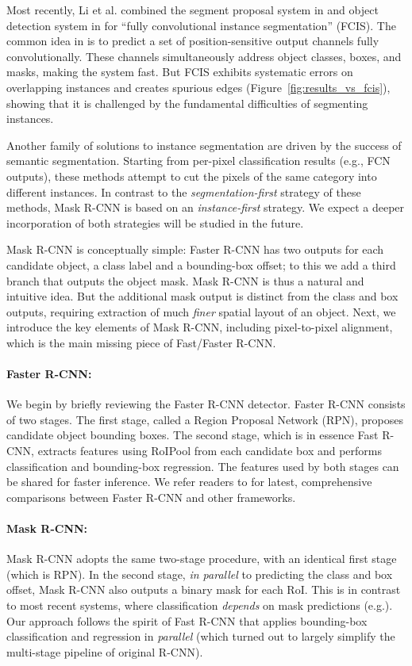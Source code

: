 Most recently, Li et al. combined the segment proposal system in and object detection system in for ``fully convolutional instance segmentation'' (FCIS). The common idea in is to predict a set of position-sensitive output channels fully convolutionally. These channels simultaneously address object classes, boxes, and masks, making the system fast. But FCIS exhibits systematic errors on overlapping instances and creates spurious edges (Figure~\ref{fig:results_vs_fcis}), showing that it is challenged by the fundamental difficulties of segmenting instances.

Another family of solutions to instance segmentation are driven by the success of semantic segmentation. Starting from per-pixel classification results (e.g., FCN outputs), these methods attempt to cut the pixels of the same category into different instances. In contrast to the \emph{segmentation-first} strategy of these methods, Mask R-CNN is based on an \emph{instance-first} strategy. We expect a deeper incorporation of both strategies will be studied in the future.

\label{sec:maskrcnn}

Mask R-CNN is conceptually simple: Faster R-CNN has two outputs for each candidate object, a class label and a bounding-box offset; to this we add a third branch that outputs the object mask. Mask R-CNN is thus a natural and intuitive idea. But the additional mask output is distinct from the class and box outputs, requiring extraction of much \emph{finer} spatial layout of an object. Next, we introduce the key elements of Mask R-CNN, including pixel-to-pixel alignment, which is the main missing piece of Fast/Faster R-CNN.

\paragraph{Faster R-CNN:} We begin by briefly reviewing the Faster R-CNN detector. Faster R-CNN consists of two stages. The first stage, called a Region Proposal Network (RPN), proposes candidate object bounding boxes. The second stage, which is in essence Fast R-CNN, extracts features using RoIPool from each candidate box and performs classification and bounding-box regression. The features used by both stages can be shared for faster inference. We refer readers to for latest, comprehensive comparisons between Faster R-CNN and other frameworks.

\paragraph{Mask R-CNN:} Mask R-CNN adopts the same two-stage procedure, with an identical first stage (which is RPN). In the second stage, \emph{in parallel} to predicting the class and box offset, Mask R-CNN also outputs a binary mask for each RoI. This is in contrast to most recent systems, where classification \emph{depends} on mask predictions (e.g.). Our approach follows the spirit of Fast R-CNN that applies bounding-box classification and regression in \emph{parallel} (which turned out to largely simplify the multi-stage pipeline of original R-CNN).

